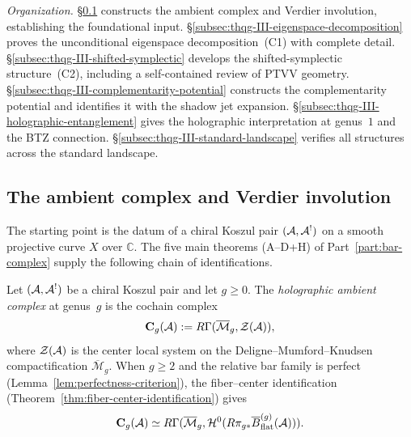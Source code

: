 \medskip
\noindent\emph{Organization.}\;
\S\ref{subsec:thqg-III-ambient-complex} constructs the ambient
complex and Verdier involution, establishing the foundational
input.
\S\ref{subsec:thqg-III-eigenspace-decomposition} proves the
unconditional eigenspace decomposition~(C1) with complete detail.
\S\ref{subsec:thqg-III-shifted-symplectic} develops the
shifted-symplectic structure~(C2), including a self-contained
review of PTVV geometry.
\S\ref{subsec:thqg-III-complementarity-potential} constructs the
complementarity potential and identifies it with the shadow jet
expansion.
\S\ref{subsec:thqg-III-holographic-entanglement} gives the
holographic interpretation at genus~$1$ and the BTZ connection.
\S\ref{subsec:thqg-III-standard-landscape} verifies all structures
across the standard landscape.

%
%

\subsection{The ambient complex and Verdier involution}
\label{subsec:thqg-III-ambient-complex}

The starting point is the datum of a chiral Koszul pair
$(\mathcal{A}, \mathcal{A}^!)$ on a smooth projective curve $X$ over $\mathbb{C}$.
The five main theorems (A--D+H) of Part~\ref{part:bar-complex} supply the following
chain of identifications.

\begin{definition}
\label{def:thqg-III-holographic-ambient}
Let $(\mathcal{A}, \mathcal{A}^!)$ be a chiral Koszul pair and let $g \ge 0$.
The \emph{holographic ambient complex} at genus~$g$ is the cochain
complex
\begin{equation}\label{eq:thqg-III-holographic-ambient}
\mathbf{C}_g(\mathcal{A})
:= R\Gamma(\overline{\mathcal{M}}_g, \mathcal{Z}(\mathcal{A})),
\end{equation}
where $\mathcal{Z}(\mathcal{A})$ is the center local system on the
Deligne--Mumford--Knudsen compactification
$\overline{\mathcal{M}}_g$. When $g \ge 2$ and the relative bar
family is perfect
(Lemma~\ref{lem:perfectness-criterion}), the fiber--center
identification
(Theorem~\ref{thm:fiber-center-identification}) gives
\begin{equation}\label{eq:thqg-III-bar-center}
\mathbf{C}_g(\mathcal{A})
\simeq
R\Gamma(\overline{\mathcal{M}}_g,
\mathcal{H}^0(R\pi_{g*}\overline{B}^{(g)}_{\mathrm{flat}}(\mathcal{A}))).
\end{equation}
\end{definition}

